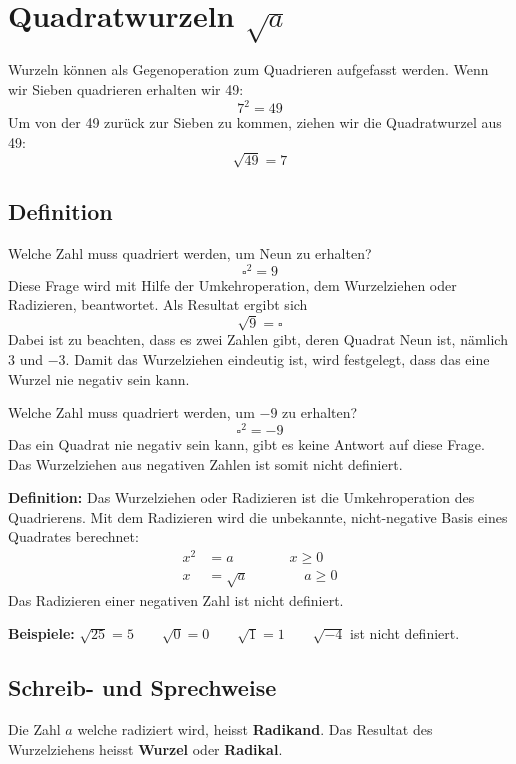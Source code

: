 \newpage
\section{Quadratwurzeln $\sqrt{a}$}

Wurzeln können als Gegenoperation zum Quadrieren aufgefasst werden. Wenn wir Sieben quadrieren erhalten wir 49:
\[
  7^{2} = 49
\]
Um von der 49 zurück zur Sieben zu kommen, ziehen wir die Quadratwurzel aus 49:
\[
  \sqrt{49} = 7
\]

\subsection{Definition}

Welche Zahl muss quadriert werden, um Neun zu erhalten?
\[
  \square^{2} = 9
\]
Diese Frage wird mit Hilfe der Umkehroperation, dem Wurzelziehen oder Radizieren, beantwortet. Als Resultat ergibt sich
\[
  \sqrt{9} = \square
\]
Dabei ist zu beachten, dass es zwei Zahlen gibt, deren Quadrat Neun ist, nämlich $3$ und $-3$. Damit das Wurzelziehen eindeutig ist, wird festgelegt, dass das eine Wurzel nie negativ sein kann.

Welche Zahl muss quadriert werden, um $-9$ zu erhalten?
\[
  \square^{2}= -9
\]
Das ein Quadrat nie negativ sein kann, gibt es keine Antwort auf diese Frage. Das Wurzelziehen aus negativen Zahlen ist somit nicht definiert.

\textbf{Definition:} Das Wurzelziehen oder Radizieren ist die Umkehroperation des Quadrierens. Mit dem Radizieren wird die unbekannte, nicht-negative Basis eines Quadrates berechnet:
\begin{align*}
  x^{2} &= a \qquad\qquad x\ge 0\\
      x &= \sqrt{a} \qquad\qquad a\ge 0
\end{align*}
Das Radizieren einer negativen Zahl ist nicht definiert.
\begin{example}
  \textbf{Beispiele:} $\sqrt{25} = 5 \qquad \sqrt{0} = 0 \qquad \sqrt{1} = 1 \qquad \sqrt{-4}$ ist nicht definiert.
\end{example}

\subsection{Schreib- und Sprechweise}

Die Zahl $a$ welche radiziert wird, heisst \textbf{Radikand}. Das Resultat des Wurzelziehens heisst \textbf{Wurzel} oder \textbf{Radikal}.

